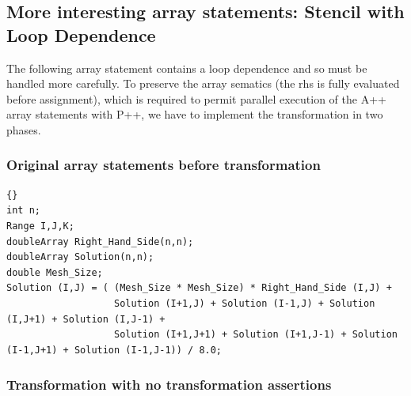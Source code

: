 \documentclass[10pt]{article}
\begin{document}
\subsection{ More interesting array statements: Stencil with Loop Dependence }

     The following array statement contains a loop dependence and so must be handled more carefully.
To preserve the array sematics (the rhs is fully evaluated before assignment), which is required to
permit parallel execution of the A++ array statements with P++, we have to implement the
transformation in two phases.
    
\subsubsection{Original array statements before transformation}

\begin{lstlisting}{}
int n;
Range I,J,K;
doubleArray Right_Hand_Side(n,n);
doubleArray Solution(n,n);
double Mesh_Size;
Solution (I,J) = ( (Mesh_Size * Mesh_Size) * Right_Hand_Side (I,J) +
                   Solution (I+1,J) + Solution (I-1,J) + Solution (I,J+1) + Solution (I,J-1) +
                   Solution (I+1,J+1) + Solution (I+1,J-1) + Solution (I-1,J+1) + Solution (I-1,J-1)) / 8.0;
\end{lstlisting}

\subsubsection{Transformation with no transformation assertions}
\end{document}
